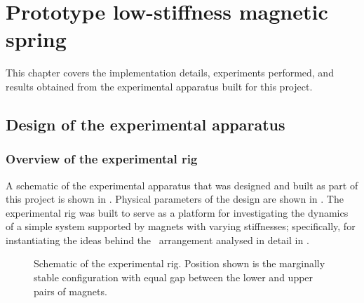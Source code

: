 
\chapter{Prototype low-stiffness magnetic spring}


This chapter covers the implementation details, experiments performed,
and results obtained from the experimental apparatus built for this
project.

\section{Design of the experimental apparatus}

\subsection{Overview of the experimental rig}

A schematic of the experimental apparatus that was designed and built as part
of this project is shown in . Physical parameters of the design
are shown in . The experimental rig was built to serve as a
platform for investigating the dynamics of a simple system supported by
magnets with varying stiffnesses; specifically, for instantiating the ideas
behind the \qzs\ arrangement analysed in detail in .

\begin{figure}
  \caption{Schematic of the experimental rig. Position shown is the marginally
  stable configuration with equal gap between the lower and upper pairs
  of magnets.}
\end{figure}


